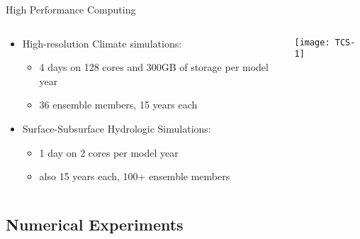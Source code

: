 \documentclass[hyperref={pdfpagelabels=false},compress,final]{beamer}
\newenvironment{myBox}[3][shadow=true]%
{\begin{center} \begin{minipage}{#2} \begin{beamerboxesrounded}[#1]{#3} \smallskip}%
      {\smallskip \end{beamerboxesrounded} \end{minipage} \end{center}}
\begin{document}
\begin{frame}{High Performance Computing}
  \begin{columns}[T]
 \begin{column}{0.5\textwidth}
  \begin{itemize}
  \item High-resolution Climate simulations:\\ \smallskip
    \begin{itemize}
     \item 4 days on 128 cores and 300GB of storage per model year
     \item 36 ensemble members, 15 years each
    \end{itemize}
  \medskip %
  \item Surface-Subsurface Hydrologic Simulations:\\ \smallskip
    \begin{itemize}
     \item 1 day on 2 cores per model year
     \item also 15 years each, 100+ ensemble members
    \end{itemize}
  \end{itemize}
 \end{column}
 \begin{column}{0.5\textwidth}
   \vspace*{-.8cm}
  \texttt{[image: TCS-1]}
 \end{column}
\end{columns}
\end{frame}


\subsection*{Numerical Experiments}
\end{document}
